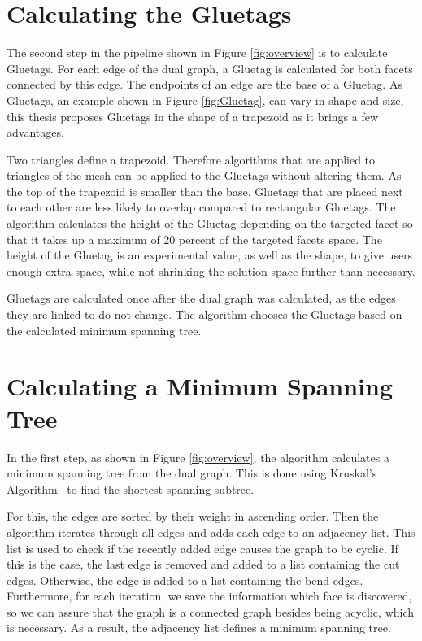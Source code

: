 \documentclass[draft,final]{vutinfth} %
\begin{document}
\section{Calculating the Gluetags}
\label{sec:calcgluetag}
The second step in the pipeline shown in Figure \ref{fig:overview} is to calculate Gluetags. For each edge of the dual graph, a Gluetag is calculated for both facets connected by this edge. The endpoints of an edge are the base of a Gluetag. As Gluetags, an example shown in Figure \ref{fig:Gluetag}, can vary in shape and size, this thesis proposes Gluetags in the shape of a trapezoid as it brings a few advantages. 

Two triangles define a trapezoid. Therefore algorithms that are applied to triangles of the mesh can be applied to the Gluetags without altering them. As the top of the trapezoid is smaller than the base, Gluetags that are placed next to each other are less likely to overlap compared to rectangular Gluetags. The algorithm calculates the height of the Gluetag depending on the targeted facet so that it takes up a maximum of 20 percent of the targeted facets space. The height of the Gluetag is an experimental value, as well as the shape, to give users enough extra space, while not shrinking the solution space further than necessary.

Gluetags are calculated once after the dual graph was calculated, as the edges they are linked to do not change. The algorithm chooses the Gluetags based on the calculated minimum spanning tree.

\section{Calculating a Minimum Spanning Tree}
\label{sec:calcmsp}
In the first step, as shown in Figure \ref{fig:overview}, the algorithm calculates a minimum spanning tree from the dual graph. This is done using Kruskal's Algorithm~\cite{kruskal1956shortest} to find the shortest spanning subtree.

For this, the edges are sorted by their weight in ascending order. Then the algorithm iterates through all edges and adds each edge to an adjacency list. This list is used to check if the recently added edge causes the graph to be cyclic. If this is the case, the last edge is removed and added to a list containing the cut edges. Otherwise, the edge is added to a list containing the bend edges. Furthermore, for each iteration, we save the information which face is discovered, so we can assure that the graph is a connected graph besides being acyclic, which is necessary. As a result, the adjacency list defines a minimum spanning tree.
\end{document}
